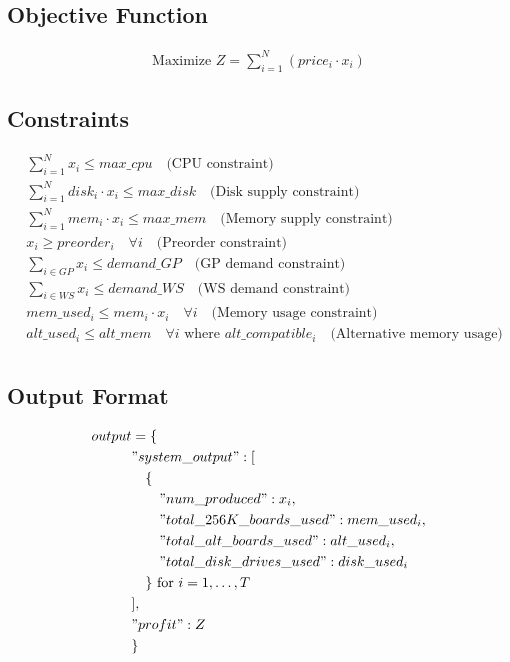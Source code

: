 \documentclass{article}
\begin{document}
\subsection*{Objective Function}
\begin{align}
    \text{Maximize } Z = \sum_{i=1}^{N} (price_i \cdot x_i)
\end{align}

\subsection*{Constraints}
\begin{align}
    & \sum_{i=1}^{N} x_i \leq max\_cpu \quad \text{(CPU constraint)} \\
    & \sum_{i=1}^{N} disk_i \cdot x_i \leq max\_disk \quad \text{(Disk supply constraint)} \\
    & \sum_{i=1}^{N} mem_i \cdot x_i \leq max\_mem \quad \text{(Memory supply constraint)} \\
    & x_i \geq preorder_i \quad \forall i \quad \text{(Preorder constraint)} \\
    & \sum_{i \in GP} x_i \leq demand\_GP \quad \text{(GP demand constraint)} \\
    & \sum_{i \in WS} x_i \leq demand\_WS \quad \text{(WS demand constraint)} \\
    & mem\_used_i \leq mem_i \cdot x_i \quad \forall i \quad \text{(Memory usage constraint)} \\
    & alt\_used_i \leq alt\_mem \quad \forall i \text{ where } alt\_compatible_i \quad \text{(Alternative memory usage)} \\
\end{align}

\subsection*{Output Format}
\begin{align*}
output & = \{ \\
& "system\_output": [\\
& \quad \{ \\
& \quad \quad "num\_produced": x_i, \\
& \quad \quad "total\_256K\_boards\_used": mem\_used_i, \\
& \quad \quad "total\_alt\_boards\_used": alt\_used_i, \\
& \quad \quad "total\_disk\_drives\_used": disk\_used_i \\
& \quad \} \text{ for } i = 1, \ldots, T\\
& ], \\
& "profit": Z \\
& \}
\end{align*}
\end{document}
